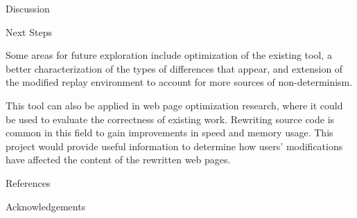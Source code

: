 \documentclass[final]{beamer}
\newlength{\onecolwid}
\begin{document}
\begin{frame}[t]
\begin{columns}[t]
\begin{column}{\onecolwid}
\begin{block}{Discussion}
\end{block}


\begin{block}{Next Steps}

Some areas for future exploration include optimization of the existing tool, a better characterization of the types of differences that appear, and extension of the modified replay environment to account for more sources of non-determinism.  

This tool can also be applied in web page optimization research, where it could be used to evaluate the correctness of existing work. Rewriting source code is common in this field to gain improvements in speed and memory usage. This project would provide useful information to determine how users' modifications have affected the content of the rewritten web pages.
\end{block}


\begin{block}{References}
\vspace{-0.5cm}
\nocite{*} %
\footnotesize{
}

\end{block}




\begin{alertblock}{Acknowledgements}

\small{} \\


\end{alertblock}
\end{column}
\end{columns}
\end{frame}
\end{document}
